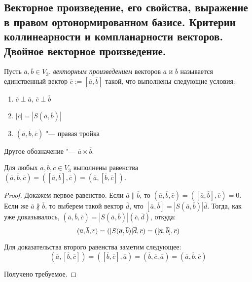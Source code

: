 \subsection{Векторное произведение, его свойства, выражение в правом ортонормированном базисе. Критерии коллинеарности и компланарности векторов. Двойное векторное произведение.}
    
    \begin{definition}
    	Пусть $\overline{a}, \overline{b} \in V_3$. \textit{векторным произведением} векторов $\overline{a}$ и $\overline{b}$ называется единственный вектор $\overline{c} := [\overline{a}, \overline{b}]$ такой, что выполнены следующие условия:
    	\begin{enumerate}
    		\item $\overline{c} \perp \overline{a}$, $\overline{c} \perp \overline{b}$
    		\item $|\overline{c}| = |S(\overline{a}, \overline{b})|$
    		\item $(\overline{a}, \overline{b}, \overline{c})$ "--- правая тройка
    	\end{enumerate}
    	
    	Другое обозначение "--- $\overline{a} \times \overline{b}$.
    \end{definition}
    
    \begin{theorem}
    	Для любых $\overline a, \overline b, \overline c \in V_3$ выполнены равенства $(\overline{a}, \overline{b}, \overline{c}) = ([\overline{a}, \overline{b}], \overline{c}) = (\overline{a}, [\overline{b}, \overline{c}])$.
    \end{theorem}
    
    \begin{proof}
    	Докажем первое равенство. Если $\overline{a} \parallel \overline{b}$, то $(\overline{a}, \overline{b}, \overline{c}) = ([\overline{a}, \overline{b}], \overline{c}) = 0$. Если же $\overline{a} \nparallel \overline{b}$, то выберем такой вектор $\overline{d}$, что $[\overline{a}, \overline{b}] = |S(\overline{a}, \overline{b})|\overline{d}$. Тогда, как уже доказывалось, $(\overline{a}, \overline{b}, \overline{c}) = |S(\overline{a}, \overline{b})|(\overline{c}, \overline{d})$, откуда:
    	\[(\overline{a}, \overline{b}, \overline{c}) \hm{=} (|S(\overline{a}, \overline{b})|\overline{d}, \overline{c}) = ([\overline{a}, \overline{b}], \overline{c})\]
    	
    	Для доказательства второго равенства заметим следующее: \[(\overline{a}, [\overline{b}, \overline{c}]) = ([\overline{b}, \overline{c}], \overline{a}) = (\overline{b}, \overline{c}, \overline{a}) = (\overline{a}, \overline{b}, \overline{c})\]
    	
    	Получено требуемое.
    \end{proof}

